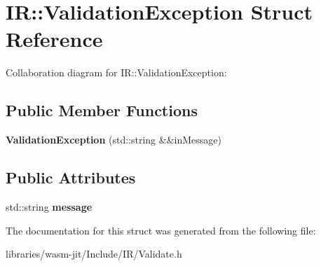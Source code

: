 \hypertarget{struct_i_r_1_1_validation_exception}{}\section{IR\+:\+:Validation\+Exception Struct Reference}
\label{struct_i_r_1_1_validation_exception}


Collaboration diagram for IR\+:\+:Validation\+Exception\+:
\subsection*{Public Member Functions}
\begin{DoxyCompactItemize}
\item 
\mbox{\label{struct_i_r_1_1_validation_exception_afd217fe01d97a27f638e7753027bb7c0}} 
{\bfseries Validation\+Exception} (std\+::string \&\&in\+Message)
\end{DoxyCompactItemize}
\subsection*{Public Attributes}
\begin{DoxyCompactItemize}
\item 
\mbox{\label{struct_i_r_1_1_validation_exception_a9308689c3efeb272361bf9a07bf8f8ae}} 
std\+::string {\bfseries message}
\end{DoxyCompactItemize}


The documentation for this struct was generated from the following file\+:\begin{DoxyCompactItemize}
\item 
libraries/wasm-\/jit/\+Include/\+I\+R/Validate.\+h\end{DoxyCompactItemize}
